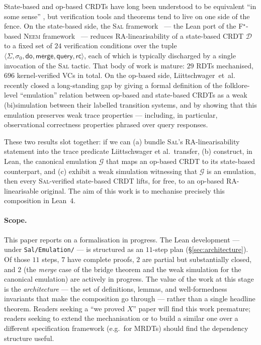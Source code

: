 \documentclass[11pt,a4paper]{article}
\theoremstyle{definition}
\theoremstyle{remark}
\newcommand{\RDT}{\ensuremath{\mathcal{D}}}
\newcommand{\mdo}{\mathsf{do}}
\newcommand{\mmerge}{\mathsf{merge}}
\newcommand{\mquery}{\mathsf{query}}
\newcommand{\mrc}{\mathsf{rc}}
\newcommand{\State}{\Sigma}
\newcommand{\init}{\sigma_0}
\newcommand{\Sal}{\textsc{Sal}}
\newcommand{\Emul}{\mathcal{G}}
\begin{document}
State-based and op-based CRDTs have long been understood to be
equivalent ``in some sense'' \cite{shapiro-crdts}, but verification
tools and theorems tend to live on one side of the fence. On the
state-based side, the \Sal{} framework~\cite{sal2025} --- the Lean
port of the F$^{\star}$-based \textsc{Neem} framework~\cite{neem2025}
--- reduces RA-linearisability of a state-based CRDT $\RDT$ to a
fixed set of $24$ verification conditions over the tuple
$\langle \State, \init, \mdo, \mmerge, \mquery, \mrc\rangle$, each of
which is typically discharged by a single invocation of the \Sal{}
tactic. That body of work is mature: $29$ RDTs mechanised, $696$
kernel-verified VCs in total. On the op-based side,
Liittschwager~et~al.~\cite{liittschwager2025} recently closed a
long-standing gap by giving a formal definition of the
folklore-level ``emulation'' relation between op-based and state-based
CRDTs as a weak (bi)simulation between their labelled transition
systems, and by showing that this emulation preserves weak trace
properties --- including, in particular, observational correctness
properties phrased over query responses.

These two results slot together: if we can (a) bundle \Sal{}'s
RA-linearisability statement into the trace predicate Liittschwager
et al.\ transfer, (b) construct, in Lean, the canonical emulation
$\Emul$ that maps an op-based CRDT to its state-based counterpart,
and (c) exhibit a weak simulation witnessing that $\Emul$ is an
emulation, then every \Sal{}-verified state-based CRDT lifts, for
free, to an op-based RA-linearisable original. The aim of this work
is to mechanise precisely this composition in Lean~4.

\paragraph{Scope.}
This paper reports on a formalisation in progress. The Lean
development --- under \texttt{Sal/Emulation/} --- is structured as an
$11$-step plan (\S\ref{sec:architecture}). Of those $11$ steps, $7$
have complete proofs, $2$ are partial but substantially closed, and
$2$ (the \emph{merge} case of the bridge theorem and the weak
simulation for the canonical emulation) are actively in progress.
The value of the work at this stage is the \emph{architecture} --- the
set of definitions, lemmas, and well-formedness invariants that make
the composition go through --- rather than a single headline theorem.
Readers seeking a ``we proved $X$'' paper will find this work
premature; readers seeking to extend the mechanisation or to build a
similar one over a different specification framework (e.g.\ for
MRDTs) should find the dependency structure useful.
\end{document}
